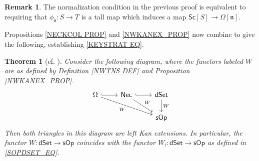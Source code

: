 \documentclass[a4paper,10pt
,draft
]{article}%
\numberwithin{equation}{section}
\numberwithin{figure}{section}
\newtheorem{theorem}[equation]{Theorem}%
\theoremstyle{definition} %
\newtheorem{remark}[equation]{Remark}%
\newcommand{\1}{\ensuremath{\mathbbm 1}}%
\begin{document}
\begin{remark}
	The normalization condition in the previous proof
	is equivalent to requiring that 
	$\phi_{\mathfrak{n}} \colon S \to T$
	is a tall map which induces a map
	$\mathsf{Sc}[S] \to \Omega[\mathfrak{n}]$.
\end{remark}



Propositions \ref{NECKCOL PROP} and 
\ref{NWKANEX_PROP}
now combine to give the following, establishing \eqref{KEYSTRAT EQ}.


\begin{theorem}[{cf. \cite[Thm. 1.3]{DS11}}]
	\label{KANEXTCHAR THM}
	Consider the following diagram,
	where the functors labeled $W$ 
	are as defined by Definition \ref{NWTNS DEF}
	and Proposition \ref{NWKANEX_PROP}.
\begin{equation}
\begin{tikzcd}
	\Omega \ar[hookrightarrow]{r}
	\ar{rrd}[swap]{W} 
&
	\mathsf{Nec}
	\ar[hookrightarrow]{r}
	\ar{rd}{W}
&
	\mathsf{dSet}
	\ar{d}{W}
\\
&&
	\mathsf{sOp} 
\end{tikzcd}
\end{equation}
Then both triangles in this diagram are left Kan extensions.
%
In particular, the functor
$W \colon \mathsf{dSet} \to \mathsf{sOp}$
coincides with the functor
$W_! \colon \mathsf{dSet} \to \mathsf{sOp}$
as defined in \eqref{SOPDSET_EQ}.
\end{theorem}
\end{document}
